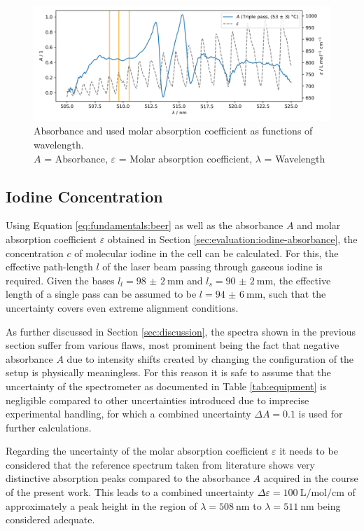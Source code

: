 \begin{figure}[H]
    \centering
    \includegraphics[width=\textwidth]{graphics/absorbance-triple.png}
    \caption{Absorbance and used molar absorption coefficient as functions of wavelength.\\
        $A$ = Absorbance, $\varepsilon$ = Molar absorption coefficient, $\lambda$ = Wavelength}
    \label{fig:evaluation:absorbance:triple}
\end{figure}

\subsection{Iodine Concentration}
\label{sec:evaluation:iodine-concentration}

Using Equation \ref{eq:fundamentals:beer} as well as the absorbance $A$ and molar absorption coefficient $\varepsilon$ obtained in Section \ref{sec:evaluation:iodine-absorbance}, the concentration $c$ of molecular iodine in the cell can be calculated.
For this, the effective path-length $l$ of the laser beam passing through gaseous iodine is required. Given the bases $l_l = \SI{98(2)}{\mm}$ and $l_s = \SI{90(2)}{\mm}$, the effective length of a single pass can be assumed to be $l = \SI{94(6)}{\mm}$, such that the uncertainty covers even extreme alignment conditions.

As further discussed in Section \ref{sec:discussion}, the spectra shown in the previous section suffer from various flaws, most prominent being the fact that negative absorbance $A$ due to intensity shifts created by changing the configuration of the setup is physically meaningless. For this reason it is safe to assume that the uncertainty of the spectrometer as documented in Table \ref{tab:equipment} is negligible compared to other uncertainties introduced due to imprecise experimental handling, for which a combined uncertainty $\Delta A = 0.1$ is used for further calculations.

Regarding the uncertainty of the molar absorption coefficient $\varepsilon$ it needs to be considered that the reference spectrum taken from literature \cite{Iodine} shows very distinctive absorption peaks compared to the absorbance $A$ acquired in the course of the present work. This leads to a combined uncertainty $\Delta \varepsilon = \SI{100}{\L\per\mol\per\cm}$ of approximately a peak height in the region of $\lambda = \SI{508}{\nm}$ to $\lambda = \SI{511}{\nm}$ being considered adequate.

